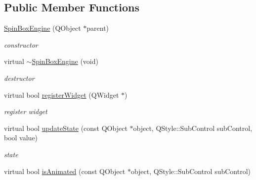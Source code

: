 \subsection*{Public Member Functions}
\begin{DoxyCompactItemize}
\item 
\mbox{\label{class_spin_box_engine_ad15276df1dcc6679c9cf00b027f4b14f}} 
\hyperlink{class_spin_box_engine_ad15276df1dcc6679c9cf00b027f4b14f}{Spin\+Box\+Engine} (Q\+Object $\ast$parent)
\begin{DoxyCompactList}\small\item\em constructor \end{DoxyCompactList}\item 
\mbox{\label{class_spin_box_engine_a77ebcbc112e3a309c6633a9c620d4380}} 
virtual \hyperlink{class_spin_box_engine_a77ebcbc112e3a309c6633a9c620d4380}{$\sim$\+Spin\+Box\+Engine} (void)
\begin{DoxyCompactList}\small\item\em destructor \end{DoxyCompactList}\item 
\mbox{\label{class_spin_box_engine_af529e878ea772de01b70d65c0a10b331}} 
virtual bool \hyperlink{class_spin_box_engine_af529e878ea772de01b70d65c0a10b331}{register\+Widget} (Q\+Widget $\ast$)
\begin{DoxyCompactList}\small\item\em register widget \end{DoxyCompactList}\item 
\mbox{\label{class_spin_box_engine_a6cb7b9a7f88aa9bad4129d182ad2413b}} 
virtual bool \hyperlink{class_spin_box_engine_a6cb7b9a7f88aa9bad4129d182ad2413b}{update\+State} (const Q\+Object $\ast$object, Q\+Style\+::\+Sub\+Control sub\+Control, bool value)
\begin{DoxyCompactList}\small\item\em state \end{DoxyCompactList}\item 
\mbox{\label{class_spin_box_engine_ab24490288f1850121fa42ee8c5231677}} 
virtual bool \hyperlink{class_spin_box_engine_ab24490288f1850121fa42ee8c5231677}{is\+Animated} (const Q\+Object $\ast$object, Q\+Style\+::\+Sub\+Control sub\+Control)

\end{DoxyCompactItemize}
